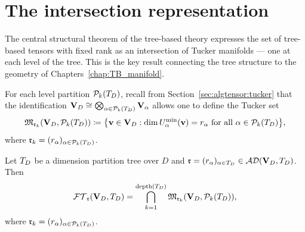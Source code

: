 \section{The intersection representation}
\label{sec:trees:intersection}

The central structural theorem of the tree-based theory expresses the
set of tree-based tensors with fixed rank as an intersection of Tucker
manifolds — one at each level of the tree. This is the key result
connecting the tree structure to the geometry of Chapters~\ref{chap:TB_manifold}.

For each level partition $\mathcal{P}_{k}(T_D)$, recall from
Section~\ref{sec:algtensor:tucker} that the identification
$\mathbf{V}_D \cong \bigotimes_{\alpha \in \mathcal{P}_{k}(T_D)} \mathbf{V}_\alpha$ allows one
to define the Tucker set
\begin{equation}
\label{eq:tucker_level_k}
    \mathfrak{M}_{\mathfrak{r}_k}(\mathbf{V}_D, \mathcal{P}_{k}(T_D))
    \coloneqq
    \bigl\{\mathbf{v} \in \mathbf{V}_D :
        \dim U^{\min}_{\alpha}(\mathbf{v}) = r_\alpha
        \text{ for all } \alpha \in \mathcal{P}_{k}(T_D)
    \bigr\},
\end{equation}
where $\mathfrak{r}_k = (r_\alpha)_{\alpha \in \mathcal{P}_{k}(T_D)}$.

\begin{theorem}
\label{thm:intersection_representation}
Let $T_D$ be a dimension partition tree over $D$ and
$\mathfrak{r} = (r_\alpha)_{\alpha \in T_D} \in \mathcal{AD}(\mathbf{V}_D,T_D)$. Then
\begin{equation}
\label{eq:intersection_representation}
    \mathcal{FT}_{\mathfrak{r}}(\mathbf{V}_D,T_D) = \bigcap_{k=1}^{\mathrm{depth}(T_D)}
    \mathfrak{M}_{\mathfrak{r}_k}(\mathbf{V}_D, \mathcal{P}_{k}(T_D)),
\end{equation}
where $\mathfrak{r}_k = (r_\alpha)_{\alpha \in \mathcal{P}_{k}(T_D)}$.
\end{theorem}

